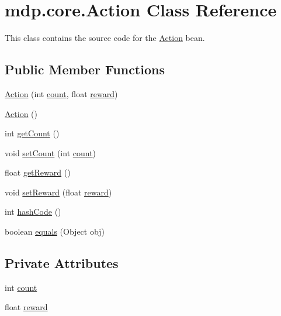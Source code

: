 \hypertarget{classmdp_1_1core_1_1_action}{}\section{mdp.\+core.\+Action Class Reference}
\label{classmdp_1_1core_1_1_action}


This class contains the source code for the \hyperlink{classmdp_1_1core_1_1_action}{Action} bean.  


\subsection*{Public Member Functions}
\begin{DoxyCompactItemize}
\item 
\hyperlink{classmdp_1_1core_1_1_action_a52ceea87b2870ea2dc87caa3c241475a}{Action} (int \hyperlink{classmdp_1_1core_1_1_action_a3fd6370ee73fdac8ec8e84e12f02f261}{count}, float \hyperlink{classmdp_1_1core_1_1_action_a6eb542e734aab31ad3c0af8eb7c6f92f}{reward})
\item 
\hyperlink{classmdp_1_1core_1_1_action_ae776304d635d82a34178963ec012959c}{Action} ()
\item 
int \hyperlink{classmdp_1_1core_1_1_action_a2d864cc0d1815571004f7f4c15e47430}{get\+Count} ()
\item 
void \hyperlink{classmdp_1_1core_1_1_action_a7b61c6ae38dbe01e17a62ee965c5eba0}{set\+Count} (int \hyperlink{classmdp_1_1core_1_1_action_a3fd6370ee73fdac8ec8e84e12f02f261}{count})
\item 
float \hyperlink{classmdp_1_1core_1_1_action_a867d1be997c0e7452a555911f0dfabd4}{get\+Reward} ()
\item 
void \hyperlink{classmdp_1_1core_1_1_action_a32a1af29ce7ea67f2776ffc9c17cb56b}{set\+Reward} (float \hyperlink{classmdp_1_1core_1_1_action_a6eb542e734aab31ad3c0af8eb7c6f92f}{reward})
\item 
int \hyperlink{classmdp_1_1core_1_1_action_a21a678468db1eca61d7f84fea8b6b4b7}{hash\+Code} ()
\item 
boolean \hyperlink{classmdp_1_1core_1_1_action_a8cdf2be8e32f579a1fa9d324330c99e2}{equals} (Object obj)
\end{DoxyCompactItemize}
\subsection*{Private Attributes}
\begin{DoxyCompactItemize}
\item 
int \hyperlink{classmdp_1_1core_1_1_action_a3fd6370ee73fdac8ec8e84e12f02f261}{count}
\item 
float \hyperlink{classmdp_1_1core_1_1_action_a6eb542e734aab31ad3c0af8eb7c6f92f}{reward}
\end{DoxyCompactItemize}


